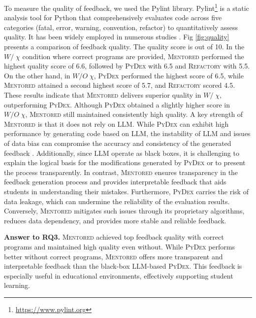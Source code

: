 \documentclass[10pt,conference]{IEEEtran}
\begin{document}
        To measure the quality of feedback, we used the Pylint library. Pylint\footnote{\url{https://www.pylint.org}} is a static analysis tool for Python that comprehensively evaluates code across five categories (fatal, error, warning, convention, refactor) to quantitatively assess quality. It has been widely employed in numerous studies \cite{siddiq2024quality, horschig2018java, apostolidis2023evaluation, agarwal2020quality}. Fig \ref{fig:quality} presents a comparison of feedback quality. The quality score is out of 10. In the $W/\;\chi$ condition where correct programs are provided, \textsc{Mentored} performed the highest quality score of 6.6, followed by \textsc{PyDex} with 6.5 and \textsc{Refactory} with 5.5. On the other hand, in $W/O\;\chi$, \textsc{PyDex} performed the highest score of 6.5, while \textsc{Mentored} attained a second highest score of 5.7, and \textsc{Refactory} scored 4.5. These results indicate that \textsc{Mentored} delivers superior quality in $W/\;\chi$, outperforming \textsc{PyDex}. Although \textsc{PyDex} obtained a slightly higher score in $W/O\;\chi$, \textsc{Mentored} still maintained consistently high quality. A key strength of \textsc{Mentored} is that it does not rely on LLM. While \textsc{PyDex} can exhibit high performance by generating code based on LLM, the instability of LLM and issues of data bias can compromise the accuracy and consistency of the generated feedback \cite{zhang2024pydex}. Additionally, since LLM operate as black boxes, it is challenging to explain the logical basis for the modifications generated by \textsc{PyDex} or to present the process transparently. In contrast, \textsc{Mentored} ensures transparency in the feedback generation process and provides interpretable feedback that aids students in understanding their mistakes. Furthermore, \textsc{PyDex} carries the risk of data leakage, which can undermine the reliability of the evaluation results. Conversely, \textsc{Mentored} mitigates such issues through its proprietary algorithms, reduces data dependency, and provides more stable and reliable feedback.

        \begin{tcolorbox}
            \textbf{Answer to RQ3.}
            \textsc{Mentored} achieved top feedback quality with correct programs and maintained high quality even without. While \textsc{PyDex} performs better without correct programs, \textsc{Mentored} offers more transparent and interpretable feedback than the black-box LLM-based \textsc{PyDex}. This feedback is especially useful in educational environments, effectively supporting student learning.
        \end{tcolorbox}
\end{document}

